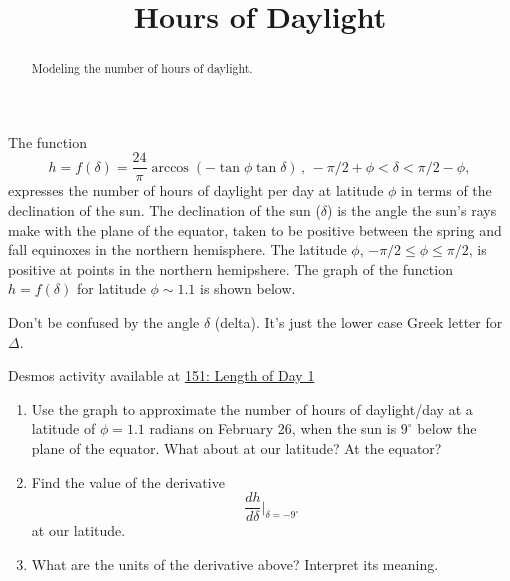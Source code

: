 \documentclass{ximera}
\title{Hours of Daylight}
\begin{document}
\begin{abstract}
Modeling the number of hours of daylight.
\end{abstract}
\maketitle


\begin{question}  \label{Qdf4ppp3455}
The function
\[
    h = f(\delta) = \frac{24}{\pi} \arccos(-\tan\phi \tan\delta) \, , \, -\pi/2+\phi < \delta < \pi/2-\phi ,
\]
expresses the number of hours of daylight per day at latitude $\phi$ in terms of the declination of the sun. The declination of the sun ($\delta$) is the angle the sun's rays make with the plane of the equator, taken to be positive between the spring and fall equinoxes in the northern hemisphere. The latitude $\phi$, $-\pi/2 \leq \phi \leq \pi/2$, is positive at points in the northern hemipshere. The graph of the function $h=f(\delta)$ for latitude $\phi\sim 1.1$ is shown below.

Don't be confused by the angle $\delta$ (delta). It's just the lower case Greek letter for $\Delta$.

\begin{onlineOnly}
    \begin{center}
\end{center}
\end{onlineOnly}

Desmos activity available at \href{https://www.desmos.com/calculator/ifomatkcta}{151: Length of Day 1}

\begin{enumerate}
\item Use the graph to approximate the number of hours of daylight/day at a latitude of $\phi=1.1$ radians on February 26, when the sun is $9^\circ$ below the plane of the equator. What about at our latitude? At the equator?

\item Find the value of the derivative
\[
  \frac{dh}{d\delta} \Big|_{\delta = -9^\circ}
\]
at our latitude.

\item What are the units of the derivative above? Interpret its meaning.
\end{enumerate}


\end{question}
\end{document}
